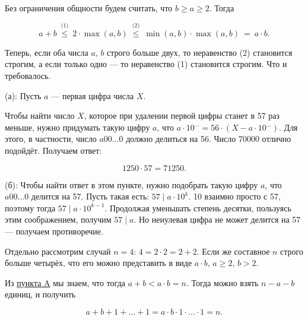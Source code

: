 \begin{itemize}

\itA \label{small-n-big-a} Без ограничения общности будем считать, что $b \geq a \geq 2$. Тогда

\vspace{-0.4cm}
$$a+b\ \stackrel{\text{(1)}}{\leq}\ 
	2 \cdot\max(a,b)\ \stackrel{\text{(2)}}{\leq}\ 
	\min(a,b) \cdot \max(a,b)\ =\ a\cdot b.$$

\noindent Теперь, если оба числа $a$, $b$ строго больше двух, то неравенство (2) становится строгим, а если только одно — то неравенство (1) становится строгим. Что и требовалось.

\itB (а): Пусть $a$ — первая цифра числа $X$.

Чтобы найти число $X$, которое при удалении первой цифры станет в 57 раз меньше, нужно придумать такую цифру $a$, что $a \cdot 10^{\ldots} = 56 \cdot (X - a \cdot 10^{\ldots})$. Для этого, в частности, число $a00\ldots 0$ должно делиться на 56. Число 70000 отлично подойдёт. Получаем ответ:

\vspace{-0.4cm}
$$1250 \cdot 57 = 71250.$$

(б): Чтобы найти ответ в этом пункте, нужно подобрать такую цифру $a$, что $a00\ldots0$ делится на 57. Пусть такая есть: $57 \mid a \cdot 10^k$. 10 взаимно просто с 57, поэтому тогда $57 \mid a\cdot 10^{k-1}$. Продолжая уменьшать степень десятки, пользуясь этим соображением, получим $57 \mid a$. Но ненулевая цифра не может делится на 57 — получаем противоречие.

\itC Отдельно рассмотрим случай $n=4$: $4 = 2 \cdot 2 = 2 + 2$. Если же составное $n$ строго больше четырёх, что его можно представить в виде $a \cdot b$, $a \geq 2$, $b > 2$. 

Из \hyperref[small-n-big-a]{пункта A} мы знаем, что тогда $a+b < a \cdot b = n$. Тогда можно взять $n-a-b$ единиц, и получить

\vspace{-0.4cm}
$$a+b+1+\ldots+1 = a\cdot b \cdot 1 \cdot \ldots \cdot 1 = n.$$
\end{itemize}